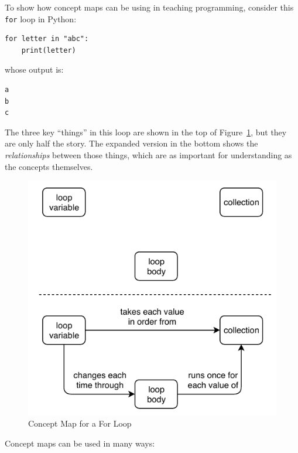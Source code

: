 To show how concept maps can be using in teaching programming, consider
this \texttt{for} loop in Python:

\begin{verbatim}
for letter in "abc":
    print(letter)
\end{verbatim}

whose output is:

\begin{verbatim}
a
b
c
\end{verbatim}

The three key ``things'' in this loop are shown in the top of
Figure~\ref{f:memory-loop}, but they are only half the story. The
expanded version in the bottom shows the \emph{relationships} between those
things, which are as important for understanding as the concepts
themselves.

\begin{figure}
\centering
\includegraphics{../../figures/for-loop.pdf}
\caption{Concept Map for a For Loop}
\label{f:memory-loop}
\end{figure}

Concept maps can be used in many ways:

